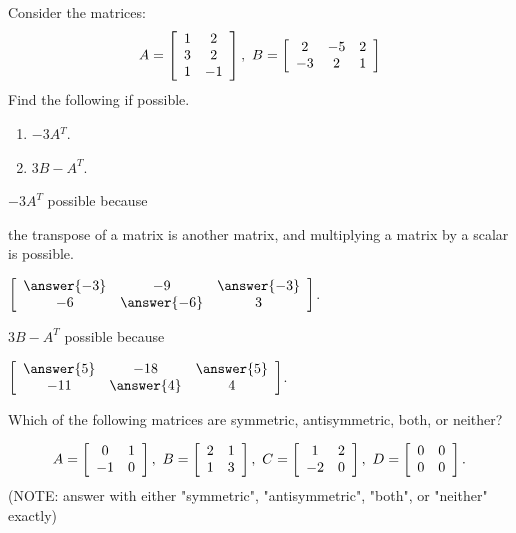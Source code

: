 \documentclass{ximera}
\author{Zack Reed}
\begin{document}
\begin{exercise}
  Consider the matrices:
  \begin{equation*}
    A = \startmat{cc}
      1 & 2 \\
      3 & 2 \\
      1 & -1
    \stopmat,
    \quad
    B = \startmat{ccc}
      2 & -5 & 2 \\
      -3 & 2 & 1
    \stopmat
  \end{equation*}
  Find the following if possible.
  \begin{enumerate}
  \item $-3A{^T}$.
  \item $3B - A^T$.
  \end{enumerate}

  $-3A^T$  possible because

  \begin{problem}
    the transpose of a matrix is another matrix, and multiplying a matrix by a scalar is possible.


$\startmat{ccc}
        \answer{-3} & -9 & \answer{-3} \\
        -6 & \answer{-6} & 3
      \stopmat$.
\end{problem}

$3B - A^T$  possible because

  \begin{problem}
\begin{selectAll}
\end{selectAll}

$\startmat{ccc}
        \answer{5} & -18 & \answer{5} \\
        -11 & \answer{4} & 4
      \stopmat$.
      \end{problem}



  Which of the following matrices are symmetric, antisymmetric, both,
  or neither?

  \begin{equation*}
    A = \startmat{cc}
      0 & 1 \\
      -1 & 0
    \stopmat,
    \quad
    B = \startmat{cc}
      2 & 1 \\
      1 & 3
    \stopmat,
    \quad
    C = \startmat{cc}
      1 & 2 \\
      -2 & 0
    \stopmat,
    \quad
    D = \startmat{cc}
      0 & 0 \\
      0 & 0
    \stopmat.
  \end{equation*}
  (NOTE: answer with either "symmetric", "antisymmetric", "both", or "neither" exactly)


\end{exercise}
\end{document}
